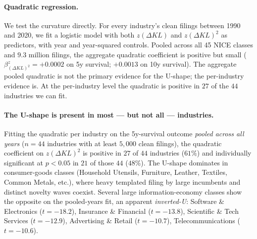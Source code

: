 \documentclass[11pt]{article}
\begin{document}
\paragraph{Quadratic regression.}
We test the curvature directly. For every industry's clean
filings between 1990 and 2020, we fit a logistic model with both
$z(\Delta KL)$ and $z(\Delta KL)^2$ as predictors, with year and
year-squared controls. Pooled across all 45 NICE classes and
$9.3$ million filings, the aggregate quadratic coefficient is
positive but small ($\beta_{(\Delta KL)^2}^z = +0.0002$ on 5y
survival; $+0.0013$ on 10y survival). The aggregate pooled
quadratic is not the primary evidence for the U-shape; the
per-industry evidence is. At the per-industry level the quadratic
is positive in $27$ of the $44$ industries we can fit.

\begin{table}[h]
\centering
\caption{Pooled quadratic logistic regression of survival outcomes
on $z$-scored $\Delta KL$ and its square. Year and year-squared
controls suppressed. A positive quadratic coefficient confirms
concave-up (``U-shape'').}
\label{tab:u-shape-pooled}

\end{table}

\paragraph{The U-shape is present in most --- but not all ---
industries.} Fitting the quadratic per industry on the 5y-survival
outcome \emph{pooled across all years} ($n = 44$ industries with at
least $5{,}000$ clean filings), the quadratic coefficient on
$z(\Delta KL)^2$ is positive in $27$ of $44$ industries ($61\%$) and
individually significant at $p < 0.05$ in $21$ of those $44$ ($48\%$).
The U-shape dominates in consumer-goods classes (Household Utensils,
Furniture, Leather, Textiles, Common Metals, etc.), where heavy
templated filing by large incumbents and distinct novelty waves
coexist. Several large information-economy classes show the opposite
on the pooled-years fit, an apparent \emph{inverted-U}: Software \&
Electronics ($t = -18.2$), Insurance \& Financial ($t = -13.8$),
Scientific \& Tech Services ($t = -12.9$), Advertising \& Retail
($t = -10.7$), Telecommunications ($t = -10.6$).
\end{document}
